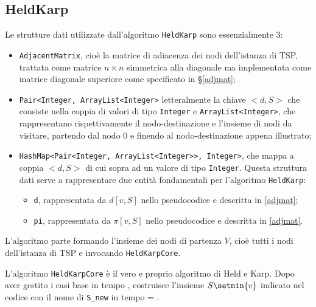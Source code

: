 \subsection{HeldKarp}
Le strutture dati utilizzate dall'algoritmo \texttt{HeldKarp} sono essenzialmente 3:
\begin{itemize}
	\item \texttt{AdjacentMatrix}, cioè la matrice di adiacenza dei nodi dell'istanza di TSP, trattata come matrice $n\times n$ simmetrica alla diagonale ma implementata come matrice diagonale superiore come specificato in \S\ref{adjmat};
	\item \texttt{Pair<Integer, ArrayList<Integer>} letteralmente la chiave $<\!\!d,S\!\!>$ che consiste nella coppia di valori di tipo \texttt{Integer} e \texttt{ArrayList<Integer>}, che rappresentano rispettivamente il nodo-destinazione e l'insieme di nodi da visitare, partendo dal nodo 0 e finendo al nodo-destinazione appena illustrato;
	\item \texttt{HashMap<Pair<Integer, ArrayList<Integer>>, Integer>}, che mappa a coppia $<\!\!d,S\!\!>$ di cui sopra ad un valore di tipo \texttt{Integer}. Questa struttura dati serve a rappresentare due entità fondamentali per l'algoritmo \texttt{HeldKarp}:
	\begin{itemize}
		\item \texttt{d}, rappresentata da $d[v,S]$ nello pseudocodice e descritta in \ref{adjmat};
		\item \texttt{pi}, rappresentata da $\pi[v,S]$ nello pseudocodice e descritta in \ref{adjmat}.
	\end{itemize}
\end{itemize}

L'algoritmo parte formando l'insieme dei nodi di partenza $V$, cioè tutti i nodi dell'istanza di TSP e invocando \texttt{HeldKarpCore}.\eqcapo

L'algoritmo \texttt{HeldKarpCore} è il vero e proprio algoritmo di Held e Karp. Dopo aver gestito i casi base in tempo , costruisce l'insieme $S\setmin \{v\}$ indicato nel codice con il nome di \texttt{S\_new} in tempo  = .\eqcapo

